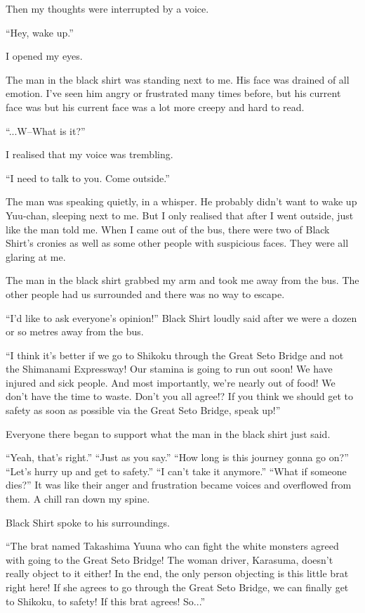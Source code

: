Then my thoughts were interrupted by a voice.

``Hey, wake up.''

I opened my eyes.

The man in the black shirt was standing next to me. His face was drained of all emotion. I've seen him angry or frustrated many times before, but his current face was but his current face was a lot more creepy and hard to read.

``...W--What is it?''

I realised that my voice was trembling.

``I need to talk to you. Come outside.''

The man was speaking quietly, in a whisper. He probably didn't want to wake up Yuu-chan, sleeping next to me. But I only realised that after I went outside, just like the man told me.
When I came out of the bus, there were two of Black Shirt's cronies as well as some other people with suspicious faces. They were all glaring at me.

The man in the black shirt grabbed my arm and took me away from the bus. The other people had us surrounded and there was no way to escape.

``I'd like to ask everyone's opinion!'' Black Shirt loudly said after we were a dozen or so metres away from the bus.

``I think it's better if we go to Shikoku through the Great Seto Bridge and not the Shimanami Expressway! Our stamina is going to run out soon! We have injured and sick people. And most importantly, we're nearly out of food! We don't have the time to waste. Don't you all agree!? If you think we should get to safety as soon as possible via the Great Seto Bridge, speak up!''

Everyone there began to support what the man in the black shirt just said.

``Yeah, that's right.'' ``Just as you say.'' ``How long is this journey gonna go on?'' ``Let's hurry up and get to safety.'' ``I can't take it anymore.'' ``What if someone dies?''
It was like their anger and frustration became voices and overflowed from them. A chill ran down my spine.

Black Shirt spoke to his surroundings.

``The brat named Takashima Yuuna who can fight the white monsters agreed with going to the Great Seto Bridge! The woman driver, Karasuma, doesn't really object to it either!  In the end, the only person objecting is this little brat right here! If she agrees to go through the Great Seto Bridge, we can finally get to Shikoku, to safety! If this brat agrees! So...''

